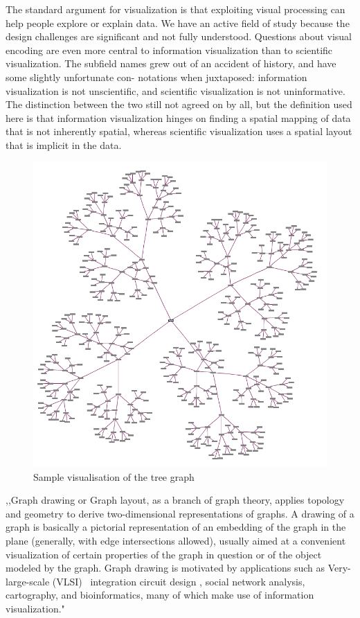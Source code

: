 The standard argument for visualization is that exploiting visual processing can help people explore or explain data. We have an active field of study because the design challenges are significant and not fully understood. Questions about visual encoding are even more central to information visualization than to scientific visualization. The subfield names grew out of an accident of history, and have some slightly unfortunate con- notations when juxtaposed: information visualization is not unscientific, and scientific visualization is not uninformative. The distinction between the two still not agreed on by all, but the definition used here is that information visualization hinges on finding a spatial mapping of data that is not inherently spatial, whereas scientific visualization uses a spatial layout that is implicit in the data.

\begin{figure}[h!]
\centering
\includegraphics[scale=0.3]{pictures/Tree_graph_example.png}
\caption{Sample visualisation of the tree graph}
\label{fig:tree_graph_example}
\end{figure}

,,Graph drawing or Graph layout, as a branch of graph theory, applies topology and geometry to derive two-dimensional representations of graphs. A drawing of a graph is basically a pictorial representation of an embedding of the graph in the plane (generally, with edge intersections allowed), usually aimed at a convenient visualization of certain properties of the graph in question or of the object modeled by the graph. Graph drawing is motivated by applications such as Very-large-scale (VLSI)~\cite{VLSI} integration circuit design , social network analysis, cartography, and bioinformatics, many of which make use of information visualization."~\cite{Graph_drawing}

